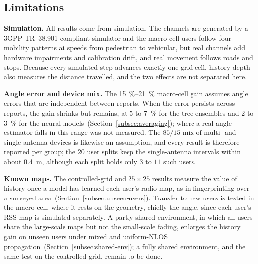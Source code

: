 \subsection{Limitations}
\label{subsec:limitations}

\noindent\textbf{Simulation.} All results come from simulation. The channels are generated by a 3GPP TR~38.901-compliant simulator and the macro-cell users follow four mobility patterns at speeds from pedestrian to vehicular, but real channels add hardware impairments and calibration drift, and real movement follows roads and stops. Because every simulated step advances exactly one grid cell, history depth also measures the distance travelled, and the two effects are not separated here.

\noindent\textbf{Angle error and device mix.} The \SIrange{15}{21}{\percent} macro-cell gain assumes angle errors that are independent between reports. When the error persists across reports, the gain shrinks but remains, at $5$ to \SI{7}{\percent} for the tree ensembles and $2$ to \SI{3}{\percent} for the neural models~(Section~\ref{subsec:averaging}); where a real angle estimator falls in this range was not measured. The $85/15$ mix of multi- and single-antenna devices is likewise an assumption, and every result is therefore reported per group; the $20$ user splits keep the single-antenna intervals within about \SI{0.4}{\meter}, although each split holds only $3$ to $11$ such users.

\noindent\textbf{Known maps.} The controlled-grid and $25\times25$ results measure the value of history once a model has learned each user's radio map, as in fingerprinting over a surveyed area~(Section~\ref{subsec:unseen-users}). Transfer to new users is tested in the macro cell, where it rests on the geometry, chiefly the angle, since each user's RSS map is simulated separately. A partly shared environment, in which all users share the large-scale maps but not the small-scale fading, enlarges the history gain on unseen users under mixed and uniform-NLOS propagation~(Section~\ref{subsec:shared-env}); a fully shared environment, and the same test on the controlled grid, remain to be done.

